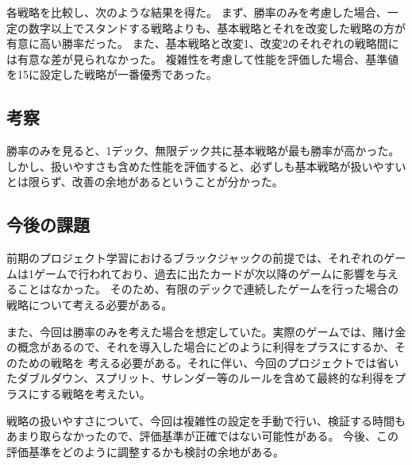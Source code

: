 各戦略を比較し、次のような結果を得た。
まず、勝率のみを考慮した場合、一定の数字以上でスタンドする戦略よりも、基本戦略とそれを改変した戦略の方が有意に高い勝率だった。
また、基本戦略と改変1、改変2のそれぞれの戦略間には有意な差が見られなかった。
複雑性を考慮して性能を評価した場合、基準値を15に設定した戦略が一番優秀であった。

\subsection{考察}

勝率のみを見ると、1デック、無限デック共に基本戦略が最も勝率が高かった。しかし、扱いやすさも含めた性能を評価すると、必ずしも基本戦略が扱いやすいとは限らず、改善の余地があるということが分かった。

\subsection{今後の課題}

前期のプロジェクト学習におけるブラックジャックの前提では、それぞれのゲームは1ゲームで行われており、過去に出たカードが次以降のゲームに影響を与えることはなかった。
そのため、有限のデックで連続したゲームを行った場合の戦略について考える必要がある。

また、今回は勝率のみを考えた場合を想定していた。実際のゲームでは、賭け金の概念があるので、それを導入した場合にどのように利得をプラスにするか、そのための戦略を
考える必要がある。それに伴い、今回のプロジェクトでは省いたダブルダウン、スプリット、サレンダー等のルールを含めて最終的な利得をプラスにする戦略を考えたい。

戦略の扱いやすさについて、今回は複雑性の設定を手動で行い、検証する時間もあまり取らなかったので、評価基準が正確ではない可能性がある。
今後、この評価基準をどのように調整するかも検討の余地がある。

